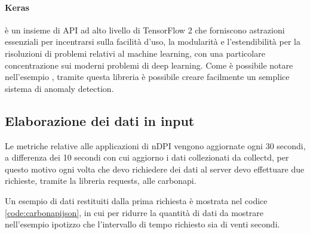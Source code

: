 \paragraph{Keras} è un insieme di API ad alto livello di TensorFlow 2 che forniscono astrazioni essenziali per incentrarsi sulla facilità d'uso, la modularità e l'estendibilità per la risoluzioni di problemi relativi al machine learning, con una particolare concentrazione sui moderni problemi di deep learning.
Come è possibile notare nell'esempio \cite{keras_esempio}, tramite questa libreria è possibile creare facilmente un semplice sistema di anomaly detection.


\subsection{Elaborazione dei dati in input}


Le metriche relative alle applicazioni di nDPI vengono aggiornate ogni 30 secondi, a differenza dei 10 secondi con cui aggiorno i dati collezionati da collectd, per questo motivo ogni volta che devo richiedere dei dati al server devo effettuare due richieste, tramite la libreria requests, alle carbonapi.


Un esempio di dati restituiti dalla prima richiesta è mostrata nel codice \ref{code:carbonapijson}, in cui per ridurre la quantità di dati da mostrare nell'esempio ipotizzo che l'intervallo di tempo richiesto sia di venti secondi.

